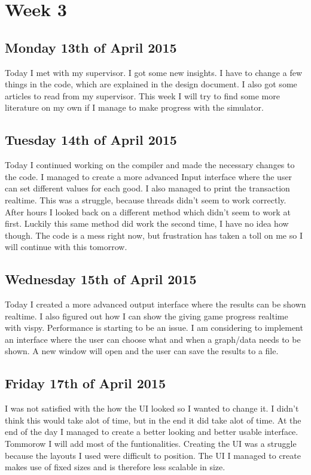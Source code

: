 \documentclass{article}
\begin{document}
\section{Week 3}

\subsection{Monday 13th of April 2015}
Today I met with my supervisor. I got some new insights. I have to change a few things in the code, which are explained in the design document. I also got some articles to read from my supervisor. This week I will try to find some more literature on my own if I manage to make progress with the simulator.

\subsection{Tuesday 14th of April 2015}
Today I continued working on the compiler and made the necessary changes to the code. I managed to create a more advanced Input interface where the user can set different values for each good. I also managed to print the transaction realtime. This was a struggle, because threads didn't seem to work correctly. After hours I looked back on a different method which didn't seem to work at first. Luckily this same method did work the second time, I have no idea how though. The code is a mess right now, but frustration has taken a toll on me so I will continue with this tomorrow.

\subsection{Wednesday 15th of April 2015}
Today I created a more advanced output interface where the results can be shown realtime. I also figured out how I can show the giving game progress realtime with vispy. Performance is starting to be an issue. I am considering to implement an interface where the user can choose what and when a graph/data needs to be shown. A new window will open and the user can save the results to a file. 

\subsection{Friday 17th of April 2015}
I was not satisfied with the how the UI looked so I wanted to change it. I didn't think this would take alot of time, but in the end it did take alot of time. At the end of the day I managed to create a better looking and better usable interface. Tommorow I will add most of the funtionalities.
Creating the UI was a struggle because the layouts I used were difficult to position. The UI I managed to create makes use of fixed sizes and is therefore less scalable in size.
\end{document}
